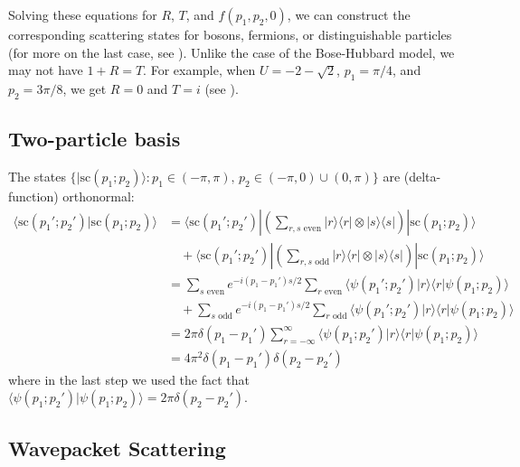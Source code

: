\documentclass[../thesis-main/thesis-main]{subfiles}
\begin{document}
Solving these equations for $R$, $T$, and $f(p_1,p_2,0)$, we can construct the corresponding scattering states for bosons, fermions, or distinguishable particles (for more on the last case, see ). Unlike the case of the Bose-Hubbard model, we may not have $1+R=T$. For example, when $U=-2-\sqrt{2}$, $p_1={\pi}/{4}$, and $p_2={3\pi}/{8}$, we get $R=0$ and $T=i$ (see ).

\subsection{Two-particle basis}



The states $\{|\mathrm{sc}(p_1;p_2)\rangle \colon p_1\in (-\pi,\pi),\,p_2\in(-\pi,0)\cup(0,\pi)\}$ are (delta-function) orthonormal:
\begin{align*}
\langle  \mathrm{sc}(p_1';p_2')|\mathrm{sc}(p_1;p_2)\rangle &= \langle \mathrm{sc}(p_1'; p_2')|\left(\sum_{\text{$r,s$ even}}|r\rangle\langle r| \otimes |s\rangle \langle s| \right)|\mathrm{sc}(p_1;p_2)\rangle\\
&\quad + \langle \mathrm{sc}(p_1'; p_2')|\left(\sum_{\text{$r,s$ odd}}|r\rangle \langle r|\otimes  |s\rangle \langle s|\right)|\mathrm{sc}(p_1;p_2)\rangle\\
&= \sum_{\text{$s$ even}} e^{-i(p_1-p_1') {s}/{2}}\sum_{\text{$r$ even}}\langle \psi(p_1';p_2')|r\rangle\langle r|\psi(p_1;p_2)\rangle \\
& \quad + \sum_{\text{$s$ odd}} e^{-i(p_1-p_1') {s}/{2}}\sum_{\text{$r$ odd}}\langle  \psi(p_1';p_2')|r\rangle\langle r|\psi(p_1;p_2)\rangle\\
&= 2\pi \delta(p_1-p_1') \sum_{r=-\infty}^{\infty}\langle \psi(p_1;p_2')|r\rangle\langle r|\psi(p_1;p_2)\rangle\\
&= 4\pi^2 \delta(p_1-p_1')\delta(p_2-p_2')
\end{align*}
where in the last step we used the fact that $\langle\psi(p_1;p_2')|\psi(p_1;p_2)\rangle=2\pi\delta(p_2-p_2')$.



\subsection{Wavepacket Scattering}

\end{document}
